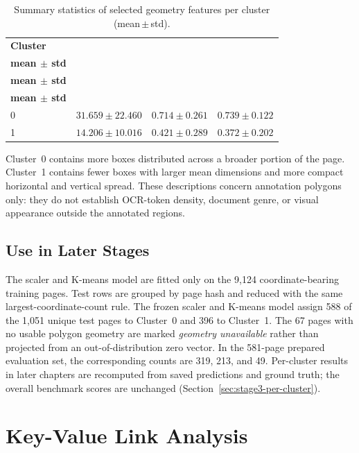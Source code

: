 \begin{table}[H]
    \centering
    \small
    \caption{Summary statistics of selected geometry features per cluster (mean\,$\pm$\,std).}
    \label{tab:stage2_cluster_stats}
    \begin{tabular}{@{}lrrr@{}}
        \toprule
        \textbf{Cluster}
            & \shortstack{\textbf{$n_{\text{boxes}}$}\\\textbf{mean $\pm$ std}}
            & \shortstack{\textbf{Vertical spread}\\\textbf{mean $\pm$ std}}
            & \shortstack{\textbf{Horizontal spread}\\\textbf{mean $\pm$ std}} \\
        \midrule
        0 & $31.659 \pm 22.460$ & $0.714 \pm 0.261$ & $0.739 \pm 0.122$ \\
        1 & $14.206 \pm 10.016$ & $0.421 \pm 0.289$ & $0.372 \pm 0.202$ \\
        \bottomrule
    \end{tabular}
\end{table}

Cluster~0 contains more boxes distributed across a broader portion of the page. Cluster~1 contains fewer boxes with larger mean dimensions and more compact horizontal and vertical spread. These descriptions concern annotation polygons only: they do not establish OCR-token density, document genre, or visual appearance outside the annotated regions.

\subsection{Use in Later Stages}
\label{subsec:cluster_use}

The scaler and K-means model are fitted only on the 9{,}124 coordinate-bearing
training pages. Test rows are grouped by page hash and reduced with the same
largest-coordinate-count rule. The frozen scaler and K-means model assign 588
of the 1{,}051 unique test pages to Cluster~0 and 396 to Cluster~1. The 67 pages
with no usable polygon geometry are marked \emph{geometry unavailable} rather
than projected from an out-of-distribution zero vector. In the 581-page prepared
evaluation set, the corresponding counts are 319, 213, and 49. Per-cluster
results in later chapters are recomputed from saved predictions and ground truth;
the overall benchmark scores are unchanged (Section~\ref{sec:stage3-per-cluster}).

\section{Key-Value Link Analysis}
\label{sec:kv_analysis}


